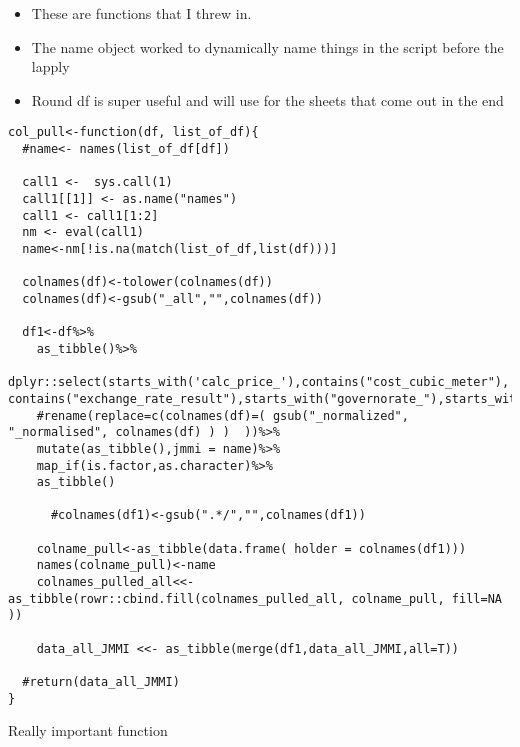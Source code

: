 \documentclass[
]{article}
\providecommand{\tightlist}{%
  \setlength{\itemsep}{0pt}\setlength{\parskip}{0pt}}
\begin{document}
\begin{itemize}
\tightlist
\item
  These are functions that I threw in.
\item
  The name object worked to dynamically name things in the script before
  the lapply
\item
  Round df is super useful and will use for the sheets that come out in
  the end
\end{itemize}

\begin{verbatim}
col_pull<-function(df, list_of_df){
  #name<- names(list_of_df[df])
 
  call1 <-  sys.call(1)
  call1[[1]] <- as.name("names")
  call1 <- call1[1:2]
  nm <- eval(call1)
  name<-nm[!is.na(match(list_of_df,list(df)))]
  
  colnames(df)<-tolower(colnames(df))
  colnames(df)<-gsub("_all","",colnames(df))
  
  df1<-df%>%
    as_tibble()%>%
    dplyr::select(starts_with('calc_price_'),contains("cost_cubic_meter"), contains("exchange_rate_result"),starts_with("governorate_"),starts_with("district_"),starts_with("fuel_gov_origin"),starts_with("wash_gov_origin"))%>%
    #rename(replace=c(colnames(df)=( gsub("_normalized", "_normalised", colnames(df) ) )  ))%>%
    mutate(as_tibble(),jmmi = name)%>%
    map_if(is.factor,as.character)%>%
    as_tibble()
  
      #colnames(df1)<-gsub(".*/","",colnames(df1))
    
    colname_pull<-as_tibble(data.frame( holder = colnames(df1)))
    names(colname_pull)<-name
    colnames_pulled_all<<-as_tibble(rowr::cbind.fill(colnames_pulled_all, colname_pull, fill=NA ))
  
    data_all_JMMI <<- as_tibble(merge(df1,data_all_JMMI,all=T))
  
  #return(data_all_JMMI)
}
\end{verbatim}

Really important function
\end{document}
